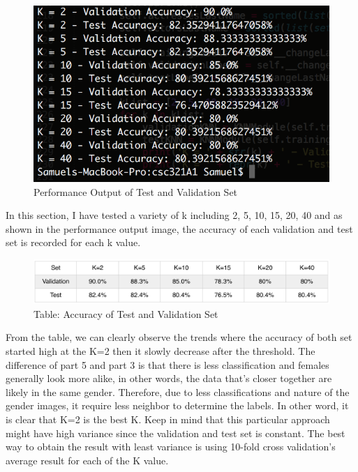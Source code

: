 \documentclass[12pt]{article} %
\begin{document}
\begin{figure}[H] %
  \centering 
  \begin{minipage}[b]{0.7\textwidth}
    \includegraphics[width=\textwidth]{part5_1}
    \caption{Performance Output of Test and Validation Set}
  \end{minipage}
\end{figure}

In this section, I have tested a variety of k including 2, 5, 10, 15, 20, 40 and as shown in the performance output image, the accuracy of each validation and test set is recorded for each k value. 

\begin{figure}[H] %
  \centering 
  \begin{minipage}[b]{0.7\textwidth}
    \includegraphics[width=\textwidth]{part5_3}
    \caption{Table: Accuracy of Test and Validation Set}
  \end{minipage}
\end{figure}

From the table, we can clearly observe the trends where the accuracy of both set started high at the K=2 then it slowly decrease after the threshold. The difference of part 5 and part 3 is that there is less classification and females generally look more alike, in other words, the data that’s closer together are likely in the same gender. Therefore, due to less classifications and nature of the gender images, it require less neighbor to determine the labels. In other word, it is clear that K=2 is the best K. Keep in mind that this particular approach might have high variance since the validation and test set is constant. The best way to obtain the result with least variance is using 10-fold cross validation’s average result for each of the K value. 
\end{document}
